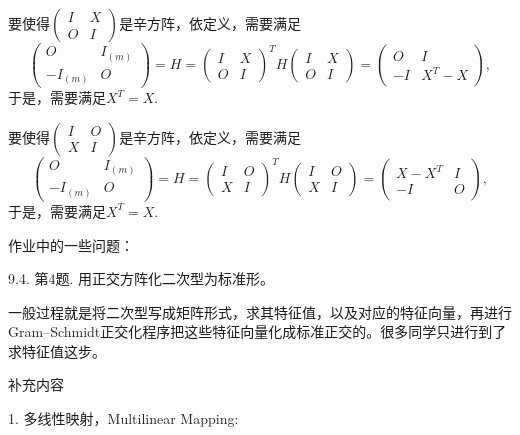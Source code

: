 要使得$\begin{pmatrix} I & X \\ O & I \end{pmatrix}$是辛方阵，依定义，需要满足
$$\begin{pmatrix} O & I_{(m)} \\ -I_{(m)} & O \end{pmatrix} = H = \begin{pmatrix} I & X \\ O & I \end{pmatrix}^T H \begin{pmatrix} I & X \\ O & I \end{pmatrix} = \begin{pmatrix} O & I \\ -I & X^T - X \end{pmatrix},$$
于是，需要满足$X^T = X$.

要使得$\begin{pmatrix} I & O \\ X & I \end{pmatrix}$是辛方阵，依定义，需要满足
$$\begin{pmatrix} O & I_{(m)} \\ -I_{(m)} & O \end{pmatrix} = H = \begin{pmatrix} I & O \\ X & I \end{pmatrix}^T H \begin{pmatrix} I & O \\ X & I \end{pmatrix} = \begin{pmatrix} X - X^T & I \\ -I & O \end{pmatrix},$$
于是，需要满足$X^T = X$.

\newpage

作业中的一些问题：

9.4. 第4题. {\color{red}用正交方阵}化二次型为标准形。

一般过程就是将二次型写成矩阵形式，求其特征值，以及对应的特征向量，再进行Gram–Schmidt正交化程序把这些特征向量化成标准正交的。很多同学只进行到了求特征值这步。

\newpage

\begin{center}
{\larger 补充内容}
\end{center}

1. 多线性映射，Multilinear Mapping:

